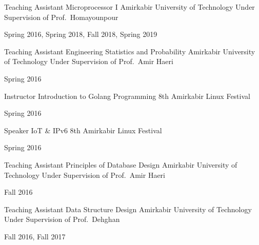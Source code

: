 \begin{cventries}
  \cventry
    {Teaching Assistant} %
    {Microprocessor I} %
    {Amirkabir University of Technology} %
    {Under Supervision of Prof.\ Homayounpour} %
    {
      \begin{cvitems} %
        Spring 2016, Spring 2018, Fall 2018, Spring 2019
      \end{cvitems}
    }

  \cventry
    {Teaching Assistant} %
    {Engineering Statistics and Probability} %
    {Amirkabir University of Technology} %
    {Under Supervision of Prof.\ Amir Haeri} %
    {
      \begin{cvitems} %
        Spring 2016
      \end{cvitems}
    }

  \cventry
    {Instructor} %
    {Introduction to Golang Programming} %
    {8th Amirkabir Linux Festival} %
    {} %
    {
      \begin{cvitems} %
        Spring 2016
      \end{cvitems}
    }

  \cventry
    {Speaker} %
    {IoT \& IPv6} %
    {8th Amirkabir Linux Festival} %
    {} %
    {
      \begin{cvitems} %
        Spring 2016
      \end{cvitems}
    }

  \cventry
    {Teaching Assistant} %
    {Principles of Database Design} %
    {Amirkabir University of Technology} %
    {Under Supervision of Prof.\ Amir Haeri} %
    {
      \begin{cvitems} %
        Fall 2016
      \end{cvitems}
    }

  \cventry
    {Teaching Assistant} %
    {Data Structure Design} %
    {Amirkabir University of Technology} %
    {Under Supervision of Prof.\ Dehghan} %
    {
      \begin{cvitems} %
        Fall 2016, Fall 2017
      \end{cvitems}
    }


\end{cventries}
